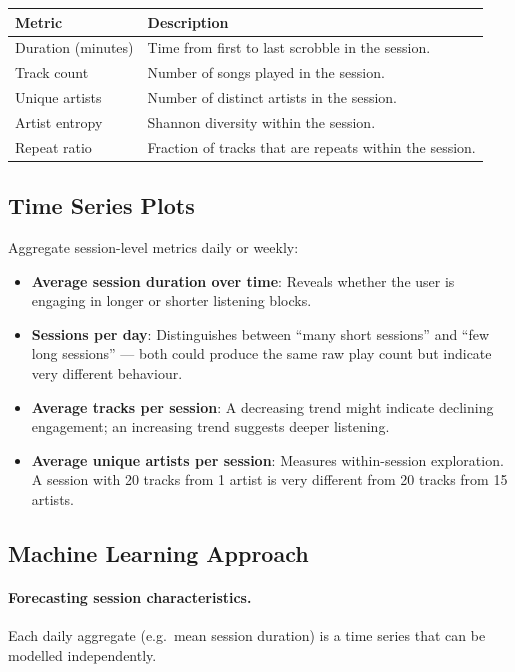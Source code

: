\documentclass[12pt, a4paper]{article}
\begin{document}
\begin{center}
\begin{tabular}{lp{8.5cm}}
    \toprule
    \textbf{Metric} & \textbf{Description} \\
    \midrule
    Duration (minutes) & Time from first to last scrobble in the session. \\
    Track count        & Number of songs played in the session. \\
    Unique artists     & Number of distinct artists in the session. \\
    Artist entropy     & Shannon diversity within the session. \\
    Repeat ratio       & Fraction of tracks that are repeats within
                         the session. \\
    \bottomrule
\end{tabular}
\end{center}

\subsection{Time Series Plots}

Aggregate session-level metrics daily or weekly:
\begin{itemize}
    \item \textbf{Average session duration over time}: Reveals whether the
          user is engaging in longer or shorter listening blocks.
    \item \textbf{Sessions per day}: Distinguishes between ``many short
          sessions'' and ``few long sessions'' --- both could produce the
          same raw play count but indicate very different behaviour.
    \item \textbf{Average tracks per session}: A decreasing trend might
          indicate declining engagement; an increasing trend suggests
          deeper listening.
    \item \textbf{Average unique artists per session}: Measures within-session
          exploration. A session with 20 tracks from 1 artist is very
          different from 20 tracks from 15 artists.
\end{itemize}

\subsection{Machine Learning Approach}

\paragraph{Forecasting session characteristics.}
Each daily aggregate (e.g.\ mean session duration) is a time series that can
be modelled independently.
\end{document}
